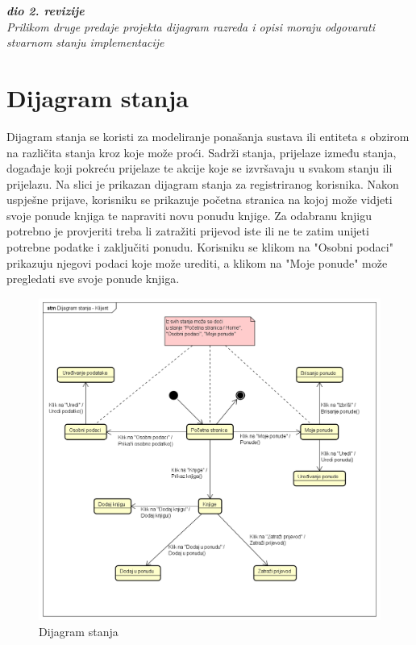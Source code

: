 			\eject
			
			
			
			\textbf{\textit{dio 2. revizije}}\\			
			
			\textit{Prilikom druge predaje projekta dijagram razreda i opisi moraju odgovarati stvarnom stanju implementacije}
			
			
			
			\eject
		
		\section{Dijagram stanja}
			
			
			Dijagram stanja se koristi za modeliranje ponašanja sustava ili entiteta s obzirom na različita stanja kroz koje može proći. Sadrži stanja, prijelaze između stanja, događaje koji pokreću prijelaze te akcije koje se izvršavaju u svakom stanju ili prijelazu. Na slici je prikazan dijagram stanja za registriranog korisnika. Nakon uspješne prijave, korisniku se prikazuje početna stranica na kojoj može vidjeti svoje ponude knjiga te napraviti novu ponudu knjige. Za odabranu knjigu potrebno je provjeriti treba li zatražiti prijevod iste ili ne te zatim unijeti potrebne podatke i zaključiti ponudu. Korisniku se klikom na "Osobni podaci" prikazuju njegovi podaci koje može urediti, a klikom na "Moje ponude" može pregledati sve svoje ponude knjiga.
			
			\eject
			
			
			\begin{figure}[H]
				\includegraphics[width=\textwidth]{dijagrami/Dijagram stanja.PNG} %
				\centering
				\caption{Dijagram stanja }
				\label{fig:dijagramstanja1}
			\end{figure} 
			
